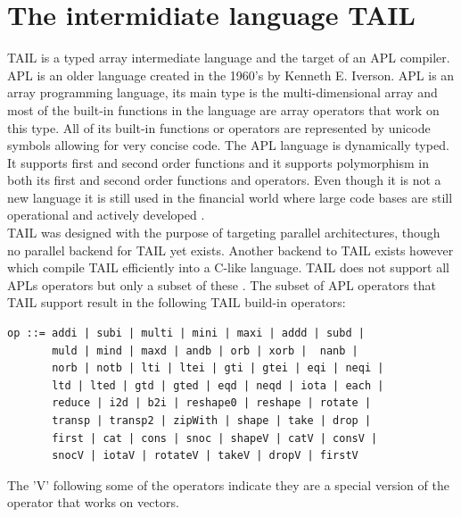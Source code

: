 \documentclass[11pt]{article}
\begin{document}
\section{The intermidiate language TAIL}

TAIL is a typed array intermediate language and the target of an APL compiler.
APL is an older language created in the 1960's by Kenneth E. Iverson.
APL is an array programming language, its main type is the multi-dimensional array 
and most of the built-in functions in the language are array operators that work on this type. 
All of its built-in functions or operators are represented by unicode symbols allowing for very concise code.
The APL language is dynamically typed. It supports first and second order functions and it supports polymorphism in 
both its first and second order functions and operators. 
Even though it is not a new language it is still used in the financial world 
where large code bases are still operational and actively developed \cite{ElsmanDybdal:Array:2014}. \\



TAIL was designed with the purpose of targeting parallel architectures, though no parallel backend for TAIL yet exists.
Another backend to TAIL exists however which compile TAIL efficiently into a C-like language. TAIL does not support
 all APLs operators but only a subset of these \cite{ElsmanDybdal:Array:2014}. 
The subset of APL operators that TAIL support result in the following TAIL build-in operators:

\begin{lstlisting}[numbers=none,frame=none]
op ::= addi | subi | multi | mini | maxi | addd | subd | 
       muld | mind | maxd | andb | orb | xorb |  nanb | 
       norb | notb | lti | ltei | gti | gtei | eqi | neqi |
       ltd | lted | gtd | gted | eqd | neqd | iota | each |
       reduce | i2d | b2i | reshape0 | reshape | rotate |
       transp | transp2 | zipWith | shape | take | drop |
       first | cat | cons | snoc | shapeV | catV | consV | 
       snocV | iotaV | rotateV | takeV | dropV | firstV 
\end{lstlisting}

The 'V' following some of the operators indicate they are a special version of the operator that works on vectors. \\

\end{document}
